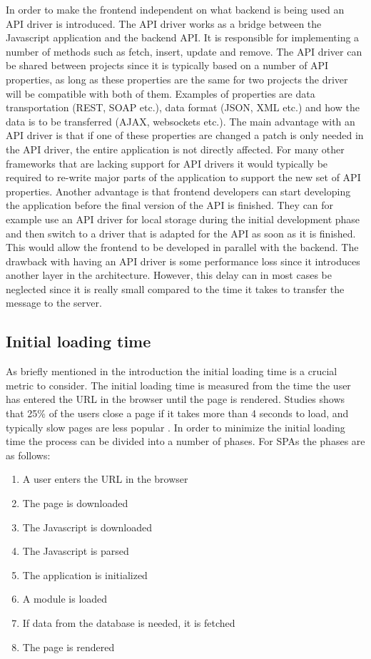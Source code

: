 In order to make the frontend independent on what backend is being used an API driver is introduced. The API driver works as a bridge between the Javascript application and the backend API. It is responsible for implementing a number of methods such as fetch, insert, update and remove. The API driver can be shared between projects since it is typically based on a number of API properties, as long as these properties are the same for two projects the driver will be compatible with both of them. Examples of properties are data transportation (REST, SOAP etc.), data format (JSON, XML etc.) and how the data is to be transferred (AJAX, websockets etc.). The main advantage with an API driver is that if one of these properties are changed a patch is only needed in the API driver, the entire application is not directly affected. For many other frameworks that are lacking support for API drivers it would typically be required to re-write major parts of the application to support the new set of API properties. Another advantage is that frontend developers can start developing the application before the final version of the API is finished. They can for example use an API driver for local storage during the initial development phase and then switch to a driver that is adapted for the API as soon as it is finished. This would allow the frontend to be developed in parallel with the backend. The drawback with having an API driver is some performance loss since it introduces another layer in the architecture. However, this delay can in most cases be neglected since it is really small compared to the time it takes to transfer the message to the server.

\subsection{Initial loading time}

As briefly mentioned in the introduction the initial loading time is a crucial metric to consider. The initial loading time is measured from the time the user has entered the URL in the browser until the page is rendered. Studies shows that 25\% of the users close a page if it takes more than 4 seconds to load, and typically slow pages are less popular \cite{slow_not_pop}. In order to minimize the initial loading time the process can be divided into a number of phases. For SPAs the phases are as follows:

\begin{enumerate}
	\item A user enters the URL in the browser
	\item The page is downloaded
	\item The Javascript is downloaded
	\item The Javascript is parsed
	\item The application is initialized
	\item A module is loaded
	\item If data from the database is needed, it is fetched
	\item The page is rendered
\end{enumerate}

